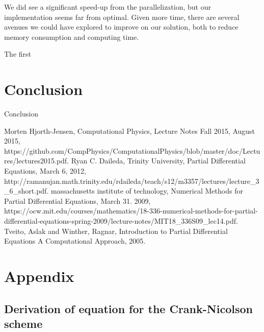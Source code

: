 \documentclass[reprint, english,notitlepage,nofootinbib]{revtex4-1}  %
\begin{document}
We did see a significant speed-up from the parallelization, but our implementation seems far from optimal. Given more time, there are several avenues we could have explored to improve on our solution, both to reduce memory consumption and computing time.

The first



\section{Conclusion}

Conclusion


\onecolumngrid
\vspace{1cm} %

\begin{thebibliography}{}
 Morten Hjorth-Jensen, Computational Physics, Lecture Notes Fall 2015, August 2015, https://github.com/CompPhysics/ComputationalPhysics/blob/master/doc/Lectures/lectures2015.pdf.
 Ryan C. Daileda, Trinity University, Partial Differential Equations, March 6, 2012, http://ramanujan.math.trinity.edu/rdaileda/teach/s12/m3357/lectures/lecture\_3\_6\_short.pdf.
 massachusetts institute of technology, Numerical Methods for Partial Differential Equations, March 31. 2009, https://ocw.mit.edu/courses/mathematics/18-336-numerical-methods-for-partial-differential-equations-spring-2009/lecture-notes/MIT18\_336S09\_lec14.pdf.
 Tveito, Aslak and Winther, Ragnar, Introduction to Partial Differential Equations A Computational Approach, 2005.

\end{thebibliography}


\section{Appendix}

\subsection{Derivation of equation for the Crank-Nicolson scheme} \label{sect:Crank-Nicolson_derivation}
\end{document}
